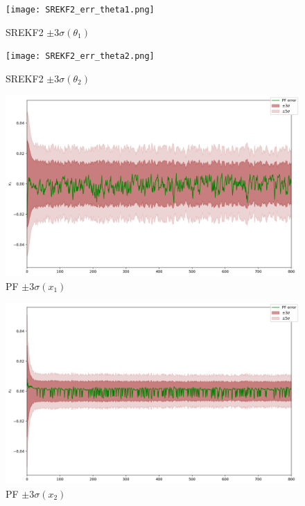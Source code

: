 \documentclass[a4paper,12pt]{article}
\begin{document}
\begin{landscape}
\begin{figure}[p]
\centering
\caption{SREKF2 $\pm 3\sigma(\theta_1)$}
\texttt{[image: SREKF2\_err\_theta1.png]}
\end{figure}

\begin{figure}[p]
\centering
\caption{SREKF2 $\pm 3\sigma(\theta_2)$}
\texttt{[image: SREKF2\_err\_theta2.png]}
\end{figure}

\begin{figure}[p]
\centering
\caption{PF $\pm 3\sigma(x_1)$}
\includegraphics[width=0.95\linewidth]{PF_err_x1.png}
\end{figure}

\begin{figure}[p]
\centering
\caption{PF $\pm 3\sigma(x_2)$}
\includegraphics[width=0.95\linewidth]{PF_err_x2.png}
\end{figure}


\end{landscape}
\end{document}
